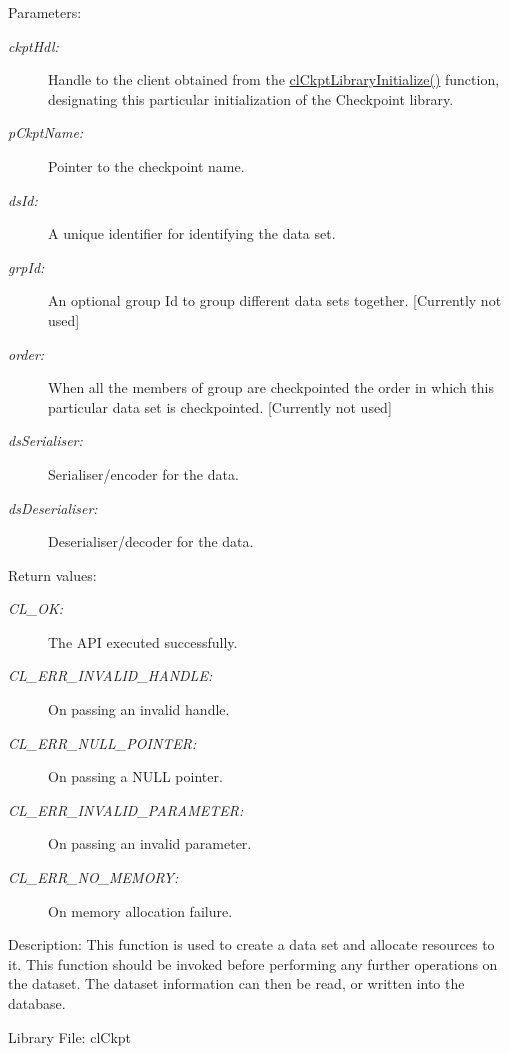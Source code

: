 \begin{Desc}
\item[Parameters:]
\begin{description}
\item[{\em ckpt\-Hdl:}]Handle to the client obtained from the \hyperlink{group__group10_ga2}{cl\-Ckpt\-Library\-Initialize()} function, designating this particular initialization of the Checkpoint library. \item[{\em p\-Ckpt\-Name:}]Pointer to the checkpoint name. \item[{\em ds\-Id:}]A unique identifier for identifying the data set. \item[{\em grp\-Id:}]An optional group Id to group different data sets together. \mbox{[}Currently not used\mbox{]} \item[{\em order:}]When all the members of group are checkpointed the order in which this particular data set is checkpointed. \mbox{[}Currently not used\mbox{]} \item[{\em ds\-Serialiser:}]Serialiser/encoder for the data. \item[{\em ds\-Deserialiser:}]Deserialiser/decoder for the data.\end{description}
\end{Desc}
\begin{Desc}
\item[Return values:]
\begin{description}
\item[{\em CL\_\-OK:}]The API executed successfully. \item[{\em CL\_\-ERR\_\-INVALID\_\-HANDLE:}]On passing an invalid handle. \item[{\em CL\_\-ERR\_\-NULL\_\-POINTER:}]On passing a NULL pointer. \item[{\em CL\_\-ERR\_\-INVALID\_\-PARAMETER:}]On passing an invalid parameter. \item[{\em CL\_\-ERR\_\-NO\_\-MEMORY:}]On memory allocation failure.\end{description}
\end{Desc}
\begin{Desc}
\item[Description:]This function is used to create a data set and allocate resources to it. This function should be invoked before performing any further operations on the dataset. The dataset information can then be read, or written into the database.\end{Desc}
\begin{Desc}
\item[Library File:]cl\-Ckpt\end{Desc}
